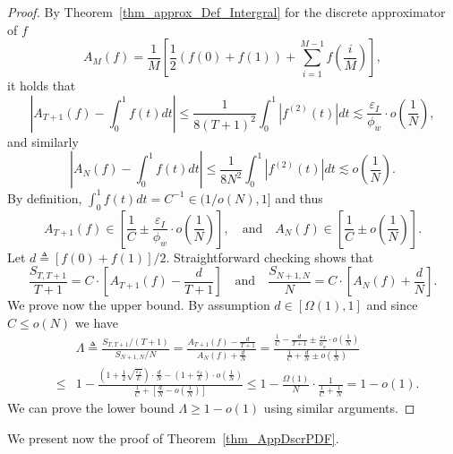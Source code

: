 \documentclass[11pt]{article}
\newcommand{\phiw}{\phi_{w}}
\newcommand{\epsI}{\eps_{I}}
\newcommand{\eps}{\epsilon}
\renewcommand{\leq}{\leqslant}
\renewcommand{\geq}{\geqslant}
\renewcommand{\eps}{\varepsilon}
\numberwithin{thm}{section}
\begin{document}
\begin{proof}
By Theorem~\ref{thm_approx_Def_Intergral} for the discrete approximator of $f$
\[
A_{M}(f)=\frac{1}{M}\left[\frac{1}{2}\left(f(0)+f(1)\right)+\sum_{i=1}^{M-1}f\left(\frac{i}{M}\right)\right],
\]
it holds that
\[
\left|A_{T+1}(f)-\int_{0}^{1}f(t)dt\right|\leq\frac{1}{8\left(T+1\right)^{2}}\int_{0}^{1}\left|f^{(2)}(t)\right|dt\lesssim\frac{\epsI}{\phiw}\cdot o\left(\frac{1}{N}\right),
\]
and similarly
\[
\left|A_{N}(f)-\int_{0}^{1}f(t)dt\right|\leq\frac{1}{8N^{2}}\int_{0}^{1}\left|f^{(2)}(t)\right|dt\lesssim o\left(\frac{1}{N}\right).
\]
By definition, $\int_{0}^{1}f(t)dt=C^{-1}\in(1/o(N),1]$
and thus
\[
A_{T+1}(f)\in\left[\frac{1}{C}\pm\frac{\epsI}{\phiw}\cdot o\left(\frac{1}{N}\right)\right],\quad\text{and}\quad A_{N}(f)\in\left[\frac{1}{C}\pm o\left(\frac{1}{N}\right)\right].
\]
Let $d\triangleq[f(0)+f(1)]/2$. Straightforward checking shows that
\[
\frac{S_{T,T+1}}{T+1}=C\cdot\left[A_{T+1}(f)-\frac{d}{T+1}\right] \quad\text{and}\quad \frac{S_{N+1,N}}{N}=C\cdot\left[A_{N}(f)+\frac{d}{N}\right].
\]
We prove now the upper bound. By assumption $d\in[\Omega(1),1]$ and since $C\leq o(N)$ we have
\begin{eqnarray*}
 &  & \Lambda \triangleq \frac{S_{T,T+1}/(T+1)}{S_{N+1,N}/N} = \frac{A_{T+1}(f)-\frac{d}{T+1}}{A_{N}(f)+\frac{d}{N}} = \frac{\frac{1}{C}-\frac{d}{T+1}\pm\frac{\epsI}{\phiw}\cdot o\left(\frac{1}{N}\right)}{\frac{1}{C}+\frac{d}{N}\pm o\left(\frac{1}{N}\right)}\\
 & \leq & 1-\frac{\left(1+\frac{1}{2}\sqrt{\frac{\epsI}{k}}\right)\cdot\frac{d}{N} - \left(1+\frac{\epsI}{k}\right)\cdot o\left(\frac{1}{N}\right)}{\frac{1}{C} + \left[\frac{d}{N} - o\left(\frac{1}{N}\right)\right]} \leq 1 - \frac{\Omega(1)}{N}\cdot\frac{1}{\frac{1}{C} + \frac{1}{N}} = 1-o(1).
\end{eqnarray*}
We can prove the lower bound $\Lambda\geq1-o(1)$ using similar arguments.
\end{proof}


We present now the proof of Theorem~\ref{thm_AppDscrPDF}.
\end{document}
